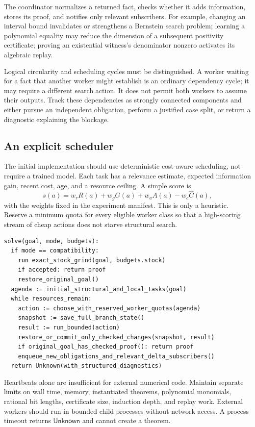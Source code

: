 \documentclass[11pt,a4paper]{article}
\theoremstyle{definition}
\newcommand{\unknown}{\ensuremath{\mathsf{Unknown}}}
\begin{document}
The coordinator normalizes a returned fact, checks whether it adds information, stores its proof, and notifies only relevant subscribers. For example, changing an interval bound invalidates or strengthens a Bernstein search problem; learning a polynomial equality may reduce the dimension of a subsequent positivity certificate; proving an existential witness's denominator nonzero activates its algebraic replay.

Logical circularity and scheduling cycles must be distinguished. A worker waiting for a fact that another worker might establish is an ordinary dependency cycle; it may require a different search action. It does not permit both workers to assume their outputs. Track these dependencies as strongly connected components and either pursue an independent obligation, perform a justified case split, or return a diagnostic explaining the blockage.

\subsection{An explicit scheduler}

The initial implementation should use deterministic cost-aware scheduling, not require a trained model. Each task has a relevance estimate, expected information gain, recent cost, age, and a resource ceiling. A simple score is
\[
  s(a)=w_r R(a)+w_g G(a)+w_a A(a)-w_c\widehat C(a),
\]
with the weights fixed in the experiment manifest. This is only a heuristic. Reserve a minimum quota for every eligible worker class so that a high-scoring stream of cheap actions does not starve structural search.

\begin{lstlisting}
solve(goal, mode, budgets):
  if mode == compatibility:
    run exact_stock_grind(goal, budgets.stock)
    if accepted: return proof
    restore_original_goal()
  agenda := initial_structural_and_local_tasks(goal)
  while resources_remain:
    action := choose_with_reserved_worker_quotas(agenda)
    snapshot := save_full_branch_state()
    result := run_bounded(action)
    restore_or_commit_only_checked_changes(snapshot, result)
    if original_goal_has_checked_proof(): return proof
    enqueue_new_obligations_and_relevant_delta_subscribers()
  return Unknown(with_structured_diagnostics)
\end{lstlisting}

Heartbeats alone are insufficient for external numerical code. Maintain separate limits on wall time, memory, instantiated theorems, polynomial monomials, rational bit lengths, certificate size, induction depth, and replay work. External workers should run in bounded child processes without network access. A process timeout returns \unknown{} and cannot create a theorem.
\end{document}
